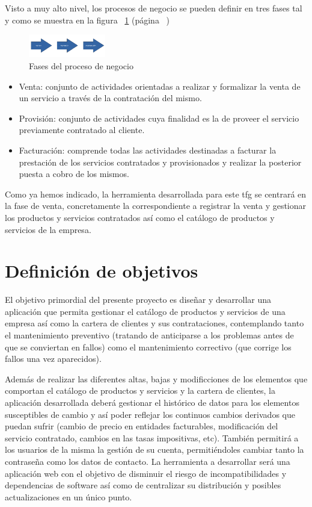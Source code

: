 Visto a muy alto nivel, los procesos de negocio se pueden definir en tres fases tal y como se muestra en la figura ~\ref{fig:fases-proceso-negocio} (página ~\pageref{fig:fases-proceso-negocio}) 


\begin{figure}[hp!]
  \centering
  \includegraphics[width=0.30\textwidth]{imaxes/fases-proceso-negocio.png}
  \caption{Fases del proceso de negocio}
  \label{fig:fases-proceso-negocio}
\end{figure}

\begin{itemize}
\item Venta: conjunto de actividades orientadas a realizar y formalizar la venta de un servicio a través de la contratación del mismo.
\item Provisión: conjunto de actividades cuya finalidad es la de proveer el servicio previamente contratado al cliente.
\item Facturación: comprende todas las actividades destinadas a facturar la prestación de los servicios contratados y provisionados y realizar la posterior puesta a cobro de los mismos.
\end{itemize}

Como ya hemos indicado, la herramienta desarrollada para este \acrlong{tfg} se centrará en la fase de venta, concretamente la correspondiente a registrar la venta y gestionar los productos y servicios contratados así como el catálogo de productos y servicios de la empresa.


\section{Definición de objetivos}
\label{sec:objetivos}


El objetivo primordial del presente proyecto es diseñar y desarrollar una aplicación que permita gestionar el catálogo de productos y servicios de una empresa así como la cartera de clientes y sus contrataciones, contemplando tanto el mantenimiento preventivo (tratando de anticiparse a los problemas antes de que se conviertan en fallos) como el mantenimiento correctivo (que corrige los fallos una vez aparecidos).

Además de realizar las diferentes altas, bajas y modificciones de los elementos que comportan el catálogo de productos y servicios y la cartera de clientes, la aplicación desarrollada deberá gestionar el histórico de datos para los elementos susceptibles de cambio y así poder reflejar los continuos cambios derivados que puedan sufrir (cambio de precio en entidades facturables, modificación del servicio contratado, cambios en las tasas impositivas, etc). También permitirá a los usuarios de la misma la gestión de su cuenta, permitiéndoles cambiar tanto la contraseña como los datos de contacto.
La herramienta a desarrollar será una aplicación web con el objetivo de disminuir el riesgo de incompatibilidades y dependencias de software así como de centralizar su distribución y posibles actualizaciones en un único punto.

